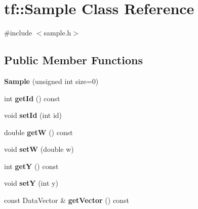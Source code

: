 \hypertarget{classtf_1_1_sample}{}\section{tf\+:\+:Sample Class Reference}
\label{classtf_1_1_sample}


{\ttfamily \#include $<$sample.\+h$>$}

\subsection*{Public Member Functions}
\begin{DoxyCompactItemize}
\item 
\hypertarget{classtf_1_1_sample_ac69f45c80396c7e5524bc663c6de41b0}{}{\bfseries Sample} (unsigned int size=0)\label{classtf_1_1_sample_ac69f45c80396c7e5524bc663c6de41b0}

\item 
\hypertarget{classtf_1_1_sample_ae9bf3c03723d874162ad2347a0dbee2b}{}int {\bfseries get\+Id} () const \label{classtf_1_1_sample_ae9bf3c03723d874162ad2347a0dbee2b}

\item 
\hypertarget{classtf_1_1_sample_ae10456a41be0384510a44b04bcd59d3b}{}void {\bfseries set\+Id} (int id)\label{classtf_1_1_sample_ae10456a41be0384510a44b04bcd59d3b}

\item 
\hypertarget{classtf_1_1_sample_a6cc2aeeb0dd9218f4f826073dbb6d9d9}{}double {\bfseries get\+W} () const \label{classtf_1_1_sample_a6cc2aeeb0dd9218f4f826073dbb6d9d9}

\item 
\hypertarget{classtf_1_1_sample_a9809eb4fc32724de25d7fe52b54559a8}{}void {\bfseries set\+W} (double w)\label{classtf_1_1_sample_a9809eb4fc32724de25d7fe52b54559a8}

\item 
\hypertarget{classtf_1_1_sample_a651bfdf931a70054c60ce625185621a7}{}int {\bfseries get\+Y} () const \label{classtf_1_1_sample_a651bfdf931a70054c60ce625185621a7}

\item 
\hypertarget{classtf_1_1_sample_afc6c6f78091b242f857b5f8944d97996}{}void {\bfseries set\+Y} (int y)\label{classtf_1_1_sample_afc6c6f78091b242f857b5f8944d97996}

\item 
\hypertarget{classtf_1_1_sample_ac92647efed703b3441a65d97a7967fe8}{}const Data\+Vector \& {\bfseries get\+Vector} () const \label{classtf_1_1_sample_ac92647efed703b3441a65d97a7967fe8}


\end{DoxyCompactItemize}
